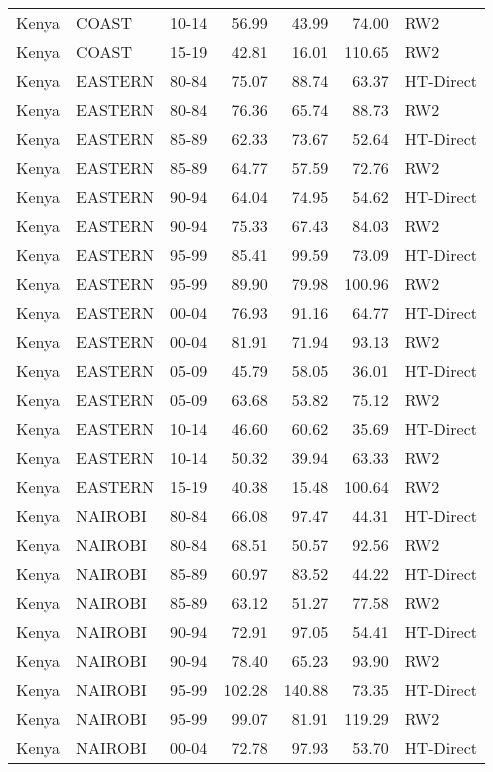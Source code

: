 \begin{longtable}{lllrrrl}
  Kenya & COAST & 10-14 & 56.99 & 43.99 & 74.00 & RW2 \\ 
  Kenya & COAST & 15-19 & 42.81 & 16.01 & 110.65 & RW2 \\ 
  Kenya & EASTERN & 80-84 & 75.07 & 88.74 & 63.37 & HT-Direct \\ 
  Kenya & EASTERN & 80-84 & 76.36 & 65.74 & 88.73 & RW2 \\ 
  Kenya & EASTERN & 85-89 & 62.33 & 73.67 & 52.64 & HT-Direct \\ 
  Kenya & EASTERN & 85-89 & 64.77 & 57.59 & 72.76 & RW2 \\ 
  Kenya & EASTERN & 90-94 & 64.04 & 74.95 & 54.62 & HT-Direct \\ 
  Kenya & EASTERN & 90-94 & 75.33 & 67.43 & 84.03 & RW2 \\ 
  Kenya & EASTERN & 95-99 & 85.41 & 99.59 & 73.09 & HT-Direct \\ 
  Kenya & EASTERN & 95-99 & 89.90 & 79.98 & 100.96 & RW2 \\ 
  Kenya & EASTERN & 00-04 & 76.93 & 91.16 & 64.77 & HT-Direct \\ 
  Kenya & EASTERN & 00-04 & 81.91 & 71.94 & 93.13 & RW2 \\ 
  Kenya & EASTERN & 05-09 & 45.79 & 58.05 & 36.01 & HT-Direct \\ 
  Kenya & EASTERN & 05-09 & 63.68 & 53.82 & 75.12 & RW2 \\ 
  Kenya & EASTERN & 10-14 & 46.60 & 60.62 & 35.69 & HT-Direct \\ 
  Kenya & EASTERN & 10-14 & 50.32 & 39.94 & 63.33 & RW2 \\ 
  Kenya & EASTERN & 15-19 & 40.38 & 15.48 & 100.64 & RW2 \\ 
  Kenya & NAIROBI & 80-84 & 66.08 & 97.47 & 44.31 & HT-Direct \\ 
  Kenya & NAIROBI & 80-84 & 68.51 & 50.57 & 92.56 & RW2 \\ 
  Kenya & NAIROBI & 85-89 & 60.97 & 83.52 & 44.22 & HT-Direct \\ 
  Kenya & NAIROBI & 85-89 & 63.12 & 51.27 & 77.58 & RW2 \\ 
  Kenya & NAIROBI & 90-94 & 72.91 & 97.05 & 54.41 & HT-Direct \\ 
  Kenya & NAIROBI & 90-94 & 78.40 & 65.23 & 93.90 & RW2 \\ 
  Kenya & NAIROBI & 95-99 & 102.28 & 140.88 & 73.35 & HT-Direct \\ 
  Kenya & NAIROBI & 95-99 & 99.07 & 81.91 & 119.29 & RW2 \\ 
  Kenya & NAIROBI & 00-04 & 72.78 & 97.93 & 53.70 & HT-Direct \\ 

\end{longtable}
